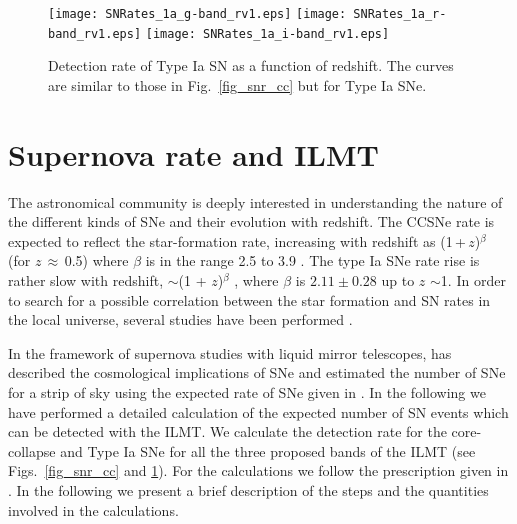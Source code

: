 \documentclass[useAMS,usenatbib]{mnras}
\begin{document}
\begin{figure}
\centering
\texttt{[image: SNRates\_1a\_g-band\_rv1.eps]}
\texttt{[image: SNRates\_1a\_r-band\_rv1.eps]}
\texttt{[image: SNRates\_1a\_i-band\_rv1.eps]}
\caption{Detection rate of Type Ia SN as a function of redshift. The curves are similar to
those in Fig.~\ref{fig_snr_cc} but for Type Ia SNe.}
\label{fig_snr_1a}
\end{figure}

\section{Supernova rate and ILMT}\label{sn_rate}

The astronomical community is deeply interested in understanding the nature of the different kinds of 
SNe and their evolution with redshift. The CCSNe rate is expected to reflect the star-formation rate, 
increasing with redshift as (1\,+\,$z$)$^{\beta}$ (for $z$$\,\approx$\,0.5) where $\beta$ is in the range
2.5 to 3.9 \citep[see][]{2004ApJ...615..209H,2005ApJ...632..169L, 2005ApJ...619L..47S,2006ApJ...651..142H,
2010ApJ...718.1171R,2012A&A...539A..31C}.
The type Ia SNe rate rise is rather slow with redshift, $\sim$(1 + $z$)$^{\beta}$ \citep[see][and references
therein]{2008ApJ...683L..25P,2012AJ....144...59P}, where $\beta$ is $2.11 \pm 0.28$ up to $z$ $\sim$1.
In order to search for a possible correlation between the star formation and SN rates in the local 
universe, several studies have been performed \citep[see, e.g.][and references therein]{2004ApJ...613..189D,
2006AJ....132.1126N,2008ApJ...682..262D,2011MNRAS.417..916G,2014ApJ...792..135T,2015A&A...584A..62C,
2017A&A...598A..50B}.

In the framework of supernova studies with liquid mirror telescopes, \citet{Borra_1a,Borra_1b,
2003A&A...404...47B} has described the cosmological implications of SNe and estimated the number of 
SNe for a strip of sky using the expected rate of SNe given in \citet{1996ApJ...473..356P}. In the 
following we have performed a detailed calculation of the expected number of SN events which can be 
detected with the ILMT. We calculate the detection rate for the core-collapse and Type Ia SNe for all 
the three proposed bands of the ILMT (see Figs.~\ref{fig_snr_cc} and \ref{fig_snr_1a}). For the 
calculations we follow the prescription given in \citet{2009JCAP...01..047L}. In the following we 
present a brief description of the steps and the quantities involved in the calculations.
\end{document}
